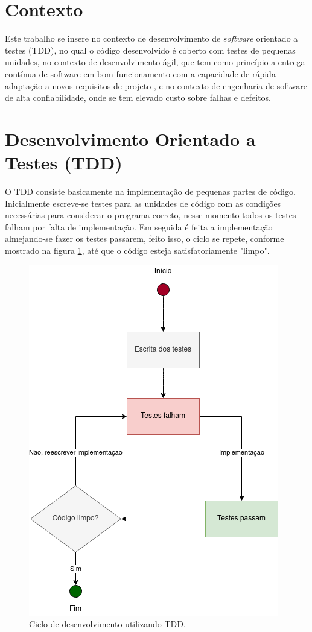 \section{Contexto}

Este trabalho se insere no contexto de desenvolvimento de \textit{software} orientado a testes (TDD), no qual o código desenvolvido é coberto com testes de pequenas unidades, no contexto de desenvolvimento ágil, que tem como princípio a entrega contínua de software em bom funcionamento com a capacidade de rápida adaptação a novos requisitos de projeto \cite{agile:principles}, e no contexto de engenharia de software de alta confiabilidade, onde se tem elevado custo sobre falhas e defeitos.


\section{Desenvolvimento Orientado a Testes (TDD)}

O TDD \cite{jorgensen:tdd} consiste basicamente na implementação de pequenas partes de código. Inicialmente escreve-se testes para as unidades de código com as condições necessárias para considerar o programa correto, nesse momento todos os testes falham por falta de implementação. Em seguida é feita a implementação almejando-se fazer os testes passarem, feito isso, o ciclo se repete, conforme mostrado na figura \ref{fig:tdd-cicle}, até que o código esteja satisfatoriamente "limpo".

\begin{figure}
    \centering
    \includegraphics[scale=0.5]{img/tdd.png}
    \caption{Ciclo de desenvolvimento utilizando TDD.}
    \label{fig:tdd-cicle}
\end{figure}

